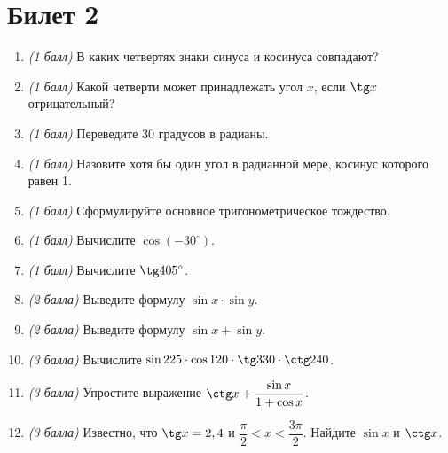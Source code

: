 \documentclass[12pt, a4paper]{article}
\begin{document}
	\section*{Билет 2}
	\begin{enumerate}
		\item \textit{(1 балл)} В каких четвертях знаки синуса и косинуса совпадают?
		\item \textit{(1 балл)} Какой четверти может принадлежать угол $x$, если $\tg x$ отрицательный?
		\item \textit{(1 балл)} Переведите 30 градусов в радианы.
		\item \textit{(1 балл)} Назовите хотя бы один угол в радианной мере, косинус которого равен 1.
		\item \textit{(1 балл)} Сформулируйте основное тригонометрическое тождество.
		\item \textit{(1 балл)} Вычислите $\cos (-30^{\circ})$.
		\item \textit{(1 балл)} Вычислите $\tg 405^{\circ}$.
		\item \textit{(2 балла)} Выведите формулу $\sin x \cdot \sin y$.
		\item \textit{(2 балла)} Выведите формулу $\sin x + \sin y$.
		\item \textit{(3 балла)} Вычислите $\sin 225 \cdot \cos 120  \cdot \tg 330 \cdot \ctg 240$.
		\item \textit{(3 балла)} Упростите выражение $\ctg x + \dfrac{\sin x}{1+\cos x}$.
		\item \textit{(3 балла)} Известно, что $\tg x = 2,4$ и $\dfrac{\pi}{2}<x<\dfrac{3\pi}{2}$. Найдите $\sin x$ и $\ctg x$.
	\end{enumerate}
	
	\newpage 
	
\end{document}
